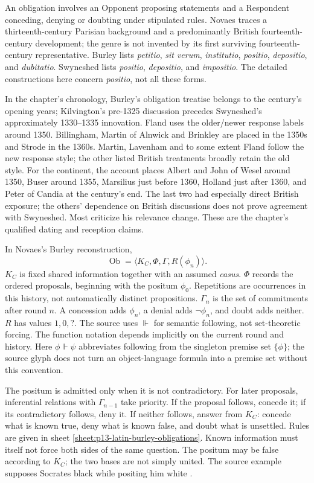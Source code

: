 An obligation involves an Opponent proposing statements and a Respondent
conceding, denying or doubting under stipulated rules. Novaes traces a
thirteenth-century Parisian background and a predominantly British
fourteenth-century development; the genre is not invented by its first
surviving fourteenth-century representative.
Burley lists \emph{petitio}, \emph{sit verum}, \emph{institutio},
\emph{positio}, \emph{depositio}, and \emph{dubitatio}.
Swyneshed lists \emph{positio}, \emph{depositio}, and \emph{impositio}.
The detailed constructions here concern \emph{positio}, not all these forms.

In the chapter's chronology, Burley's obligation treatise belongs to the
century's opening years; Kilvington's pre-1325 discussion precedes
Swyneshed's approximately 1330--1335 innovation. Fland uses the older/newer
response labels around 1350. Billingham, Martin of Alnwick and Brinkley
are placed in the 1350s and Strode in the 1360s.
Martin, Lavenham and to some extent Fland follow the new response style;
the other listed British treatments broadly retain the old style.
For the continent, the account places Albert and John of Wesel around 1350,
Buser around 1355, Marsilius just before 1360, Holland just after 1360,
and Peter of Candia at the century's end. The last two had especially
direct British exposure; the others' dependence on British discussions
does not prove agreement with Swyneshed. Most criticize his relevance
change. These are the chapter's qualified dating and reception claims.

In Novaes's Burley reconstruction,
\[
 \operatorname{Ob}=\langle K_C,\Phi,\Gamma,R(\phi_n)\rangle .
\]
\(K_C\) is fixed shared information together with an assumed \emph{casus}.
\(\Phi\) records the ordered proposals, beginning with the positum
\(\phi_0\). Repetitions are occurrences in this history, not automatically
distinct propositions. \(\Gamma_n\) is the set of commitments after round
\(n\). A concession adds \(\phi_n\), a denial adds \(\neg\phi_n\),
and doubt adds neither. \(R\) has values \(1,0,?\).
The source uses \(\Vdash\) for semantic following, not set-theoretic forcing.
The function notation depends implicitly on the current round and history.
Here \(\phi\Vdash\psi\) abbreviates following from the singleton
premise set \(\{\phi\}\); the source glyph does not turn an object-language
formula into a premise set without this convention.

The positum is admitted only when it is not contradictory.
For later proposals, inferential relations with \(\Gamma_{n-1}\) take
priority. If the proposal follows, concede it; if its contradictory
follows, deny it. If neither follows, answer from \(K_C\): concede what
is known true, deny what is known false, and doubt what is unsettled.
Rules are given in sheet \ref{sheet:p13-latin-burley-obligations}.
Known information must itself not force both sides of the same question.
The positum may be false according to \(K_C\); the two bases are not
simply united. The source example supposes Socrates black while positing
him white \cite[pp.~484--489]{DutilhNovaes2007FordhamChapter8}.

